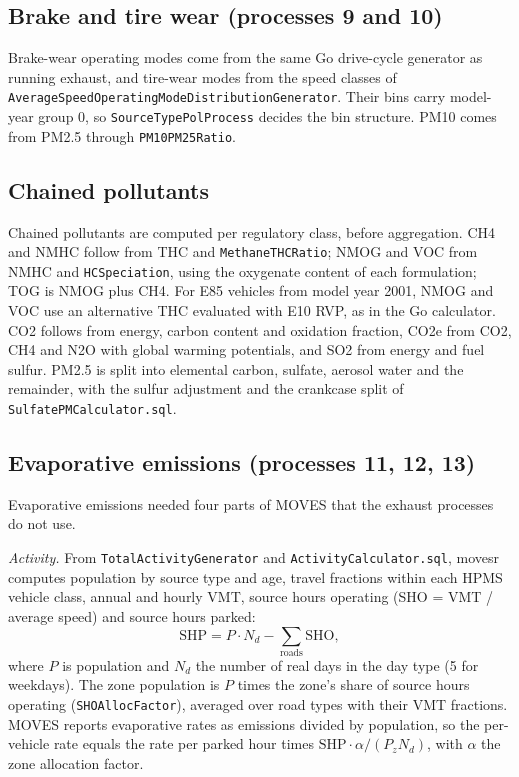 \documentclass[preprint,
3p]{elsarticle} %
\begin{document}
\subsection{Brake and tire wear (processes 9 and
10)}\label{brake-and-tire-wear-processes-9-and-10}

Brake-wear operating modes come from the same Go drive-cycle generator
as running exhaust, and tire-wear modes from the speed classes of
\texttt{AverageSpeedOperatingModeDistributionGenerator}. Their bins
carry model-year group 0, so \texttt{SourceTypePolProcess} decides the
bin structure. PM10 comes from PM2.5 through \texttt{PM10PM25Ratio}.

\subsection{Chained pollutants}\label{chained-pollutants}

Chained pollutants are computed per regulatory class, before
aggregation. CH4 and NMHC follow from THC and \texttt{MethaneTHCRatio};
NMOG and VOC from NMHC and \texttt{HCSpeciation}, using the oxygenate
content of each formulation; TOG is NMOG plus CH4. For E85 vehicles from
model year 2001, NMOG and VOC use an alternative THC evaluated with E10
RVP, as in the Go calculator. CO2 follows from energy, carbon content
and oxidation fraction, CO2e from CO2, CH4 and N2O with global warming
potentials, and SO2 from energy and fuel sulfur. PM2.5 is split into
elemental carbon, sulfate, aerosol water and the remainder, with the
sulfur adjustment and the crankcase split of
\texttt{SulfatePMCalculator.sql}.

\subsection{Evaporative emissions (processes 11, 12,
13)}\label{evaporative-emissions-processes-11-12-13}

Evaporative emissions needed four parts of MOVES that the exhaust
processes do not use.

\emph{Activity.} From \texttt{TotalActivityGenerator} and
\texttt{ActivityCalculator.sql}, movesr computes population by source
type and age, travel fractions within each HPMS vehicle class, annual
and hourly VMT, source hours operating (SHO = VMT / average speed) and
source hours parked: \begin{equation}
\mathrm{SHP} = P \cdot N_d - \sum_{\mathrm{roads}} \mathrm{SHO},
\end{equation} where \(P\) is population and \(N_d\) the number of real
days in the day type (5 for weekdays). The zone population is \(P\)
times the zone's share of source hours operating
(\texttt{SHOAllocFactor}), averaged over road types with their VMT
fractions. MOVES reports evaporative rates as emissions divided by
population, so the per-vehicle rate equals the rate per parked hour
times \(\mathrm{SHP}\cdot\alpha/(P_z N_d)\), with \(\alpha\) the zone
allocation factor.
\end{document}

